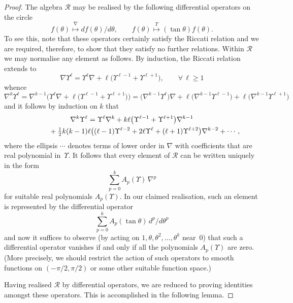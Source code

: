 \begin{proof} The algebra ${\mathcal{R}}$ may be realised by the
following dif\/ferential operators on the circle
\[f(\theta)\stackrel{\nabla}{\longmapsto} df(\theta)/d\theta,\qquad
f(\theta)\stackrel{\Upsilon}{\longmapsto}(\tan\theta)f(\theta).\]
To see this, note that these operators certainly satisfy the Riccati
relation and we are required, therefore, to show that they satisfy no further
relations. Within ${\mathcal{R}}$ we may normalise any element as follows. By
induction, the Riccati relation extends to
\[\nabla\Upsilon^\ell=
\Upsilon^\ell\nabla+\ell\big(\Upsilon^{\ell-1}+\Upsilon^{\ell+1}\big),\qquad
\forall\,\ell\geq 1\]
whence
\[\nabla^k\Upsilon^\ell
=\nabla^{k-1}\big(\Upsilon^\ell\nabla
+\ell\big(\Upsilon^{\ell-1}+\Upsilon^{\ell+1}\big)\big)
=\big(\nabla^{k-1}\Upsilon^\ell\big)\nabla
+\ell\big(\nabla^{k-1}\Upsilon^{\ell-1}\big)+\ell\big(\nabla^{k-1}\Upsilon^{\ell+1}\big)\]
and it follows by induction on $k$ that
\begin{gather*}
\nabla^k\Upsilon^\ell=
\Upsilon^\ell\nabla^k+k\ell\big(\Upsilon^{\ell-1}+\Upsilon^{\ell+1}\big)\nabla^{k-1}\\
\hphantom{\nabla^k\Upsilon^\ell=}{}
+\tfrac12k(k-1)\ell\big((\ell-1)\Upsilon^{\ell-2}+2\ell\Upsilon^\ell
+(\ell+1)\Upsilon^{\ell+2}\big)\nabla^{k-2}+\cdots,
\end{gather*}
where the ellipsis $\cdots$ denotes terms of lower order in $\nabla$ with
coef\/f\/icients that are real polynomial in~$\Upsilon$. It follows that every
element of ${\mathcal{R}}$ can be written uniquely in the form
\[ \sum_{p=0}^{k}A_p(\Upsilon)\,\nabla^p\]
for suitable real polynomials $A_p(\Upsilon)$. In our claimed realisation,
such an element is represented by the dif\/ferential operator
\[ \sum_{p=0}^{k}A_p(\tan\theta)\,d^p/d\theta^p\]
and now it suf\/f\/ices to observe (by acting on
$1,\theta,\theta^2,\ldots,\theta^{k}$ near~$0$) that such a dif\/ferential
operator vanishes if and only if all the polynomials $A_p(\Upsilon)$ are zero.
(More precisely, we should restrict the action of such operators to smooth
functions on $(-\pi/2,\pi/2)$ or some other suitable function space.)

Having realised ${\mathcal{R}}$ by dif\/ferential operators, we are reduced to
proving identities amongst these operators. This is accomplished in the
following lemma.\end{proof}

